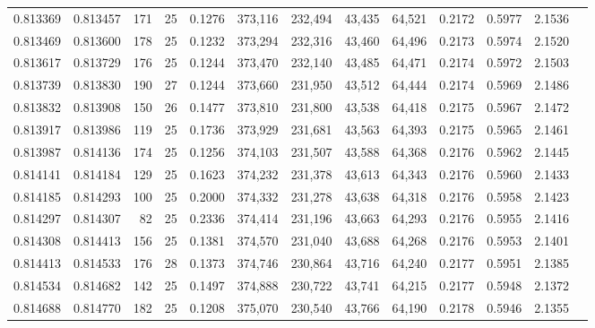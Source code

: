 \begin{tabular}{rrrrrrrrrrrrr}
0.813369 & 0.813457 &   171 &  25 &                                     0.1276 & 373,116 & 232,494 &  43,435 &  64,521 & 0.2172 & 0.5977 & 2.1536 \\
0.813469 & 0.813600 &   178 &  25 &                                     0.1232 & 373,294 & 232,316 &  43,460 &  64,496 & 0.2173 & 0.5974 & 2.1520 \\
0.813617 & 0.813729 &   176 &  25 &                                     0.1244 & 373,470 & 232,140 &  43,485 &  64,471 & 0.2174 & 0.5972 & 2.1503 \\
0.813739 & 0.813830 &   190 &  27 &                                     0.1244 & 373,660 & 231,950 &  43,512 &  64,444 & 0.2174 & 0.5969 & 2.1486 \\
0.813832 & 0.813908 &   150 &  26 &                                     0.1477 & 373,810 & 231,800 &  43,538 &  64,418 & 0.2175 & 0.5967 & 2.1472 \\
0.813917 & 0.813986 &   119 &  25 &                                     0.1736 & 373,929 & 231,681 &  43,563 &  64,393 & 0.2175 & 0.5965 & 2.1461 \\
0.813987 & 0.814136 &   174 &  25 &                                     0.1256 & 374,103 & 231,507 &  43,588 &  64,368 & 0.2176 & 0.5962 & 2.1445 \\
0.814141 & 0.814184 &   129 &  25 &                                     0.1623 & 374,232 & 231,378 &  43,613 &  64,343 & 0.2176 & 0.5960 & 2.1433 \\
0.814185 & 0.814293 &   100 &  25 &                                     0.2000 & 374,332 & 231,278 &  43,638 &  64,318 & 0.2176 & 0.5958 & 2.1423 \\
0.814297 & 0.814307 &    82 &  25 &                                     0.2336 & 374,414 & 231,196 &  43,663 &  64,293 & 0.2176 & 0.5955 & 2.1416 \\
0.814308 & 0.814413 &   156 &  25 &                                     0.1381 & 374,570 & 231,040 &  43,688 &  64,268 & 0.2176 & 0.5953 & 2.1401 \\
0.814413 & 0.814533 &   176 &  28 &                                     0.1373 & 374,746 & 230,864 &  43,716 &  64,240 & 0.2177 & 0.5951 & 2.1385 \\
0.814534 & 0.814682 &   142 &  25 &                                     0.1497 & 374,888 & 230,722 &  43,741 &  64,215 & 0.2177 & 0.5948 & 2.1372 \\
0.814688 & 0.814770 &   182 &  25 &                                     0.1208 & 375,070 & 230,540 &  43,766 &  64,190 & 0.2178 & 0.5946 & 2.1355 \\

\end{tabular}
